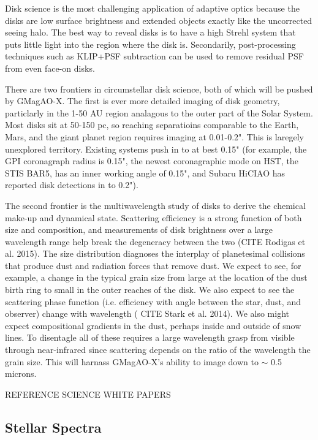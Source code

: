 \documentclass[12pt,preprint]{aastex}
\begin{document}
Disk science is the most challenging application of adaptive optics because
the disks are low surface brightness and extended objects exactly like the
uncorrected seeing halo. The best way to reveal disks is to have a high Strehl
system that puts little light into the region where the disk is. Secondarily,
post-processing techniques such as KLIP+PSF subtraction can be used to remove
residual PSF from even face-on disks.

There are two frontiers in circumstellar disk science, both of which will be
pushed by GMagAO-X. The first is ever more detailed imaging of disk geometry,
particlarly in the 1-50 AU region analagous to the outer part of the Solar
System. Most disks sit at 50-150 pc, so reaching separatioins comparable to the Earth, Mars, and the giant
planet region requires imaging at 0.01-0.2". This is laregely unexplored
territory. Existing systems push in to at best 0.15" (for example, the GPI
coronagraph radius is 0.15", the newest coronagraphic mode on HST, the STIS
BAR5, has an inner working angle of 0.15", and Subaru HiCIAO has reported disk
detections in to 0.2").  

The second frontier is the multiwavelength study of disks to derive the
chemical make-up and dynamical state.  Scattering efficiency is a strong
function of both size and composition, and measurements of disk brightness
over a large wavelength range help break the degeneracy between the two
(CITE Rodigas et al. 2015). The size distribution diagnoses the interplay of
planetesimal collisions that produce dust and radiation forces that remove
dust. We expect to see, for example, a change in the typical grain size from
large at the location of the dust birth ring to small in the outer reaches of
the disk. We also expect to see the scattering phase function (i.e. efficiency
with angle between the star, dust, and observer) change with wavelength ( CITE Stark
et al. 2014). We also might expect compositional gradients in the dust,
perhaps inside and outside of snow lines. To disentagle all of these requires
a large wavelength grasp from visible through near-infrared since scattering
depends on the ratio of the wavelength the grain size. This will harnass GMagAO-X's ability to
image down to $\sim$ 0.5 microns.

REFERENCE SCIENCE WHITE PAPERS

\subsection{ Stellar Spectra}
\end{document}
